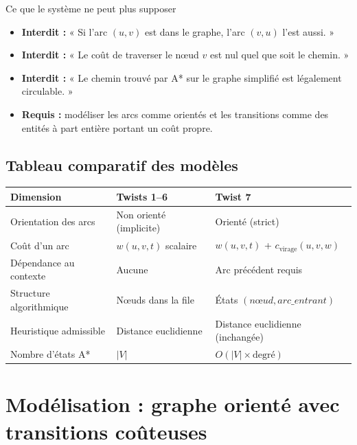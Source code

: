 \documentclass[12pt,a4paper]{article}
\theoremstyle{definition}
\theoremstyle{remark}
\begin{document}
\begin{alertbox}{Ce que le système ne peut plus supposer}
\begin{itemize}[leftmargin=1.5em]
  \item \textbf{Interdit :} « Si l'arc $(u, v)$ est dans le graphe, l'arc $(v, u)$ l'est aussi. »
  \item \textbf{Interdit :} « Le coût de traverser le nœud $v$ est nul quel que soit le chemin. »
  \item \textbf{Interdit :} « Le chemin trouvé par A* sur le graphe simplifié est légalement circulable. »
  \item \textbf{Requis :} modéliser les arcs comme orientés et les transitions
    comme des entités à part entière portant un coût propre.
\end{itemize}
\end{alertbox}

\subsection{Tableau comparatif des modèles}

\begin{center}
\begin{tabular}{lll}
  \toprule
  \textbf{Dimension} & \textbf{Twists 1–6} & \textbf{Twist 7} \\
  \midrule
  Orientation des arcs     & Non orienté (implicite) & Orienté (strict) \\
  Coût d'un arc            & $w(u,v,t)$ scalaire     & $w(u,v,t)$ + $c_\text{virage}(u,v,w)$ \\
  Dépendance au contexte   & Aucune                  & Arc précédent requis \\
  Structure algorithmique  & Nœuds dans la file      & États $(nœud, arc\_entrant)$ \\
  Heuristique admissible   & Distance euclidienne    & Distance euclidienne (inchangée) \\
  Nombre d'états A*        & $|V|$                   & $O(|V| \times \text{degré})$ \\
  \bottomrule
\end{tabular}
\end{center}

\newpage

\section{Modélisation : graphe orienté avec transitions coûteuses}
\end{document}
